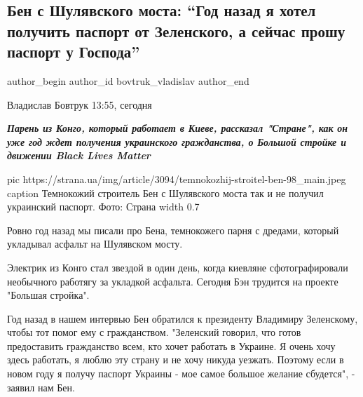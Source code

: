  
 
 
 
 
 
\subsection{Бен с Шулявского моста: \enquote{Год назад я хотел получить паспорт от Зеленского, а сейчас прошу паспорт у Господа}}
\label{sec:31_12_2020.news.ua.strana.bovtruk_vladislav.1.ben_s_shuljavskogo_mosta}
\ifcmt
	author_begin
   author_id bovtruk_vladislav
	author_end
\fi

Владислав Бовтрук 13:55, сегодня

\begin{leftbar}
  \begingroup
    \em\Large\bfseries\color{blue}
Парень из Конго, который работает в Киеве, рассказал "Стране", как он уже год
ждет получения украинского гражданства, о Большой стройке и движении Black
Lives Matter
  \endgroup
\end{leftbar}


\ifcmt
  pic https://strana.ua/img/article/3094/temnokozhij-stroitel-ben-98_main.jpeg
	caption Темнокожий строитель Бен с Шулявского моста так и не получил украинский паспорт. Фото: Страна 
  width 0.7
\fi


Ровно год назад мы писали про Бена, темнокожего парня с дредами, который
укладывал асфальт на Шулявском мосту.  

Электрик из Конго стал звездой в один день, когда киевляне
сфотографировали необычного работягу за укладкой асфальта. Сегодня Бэн
трудится на проекте "Большая стройка".

Год назад в нашем интервью Бен обратился к президенту Владимиру
Зеленскому, чтобы тот помог ему с гражданством. "Зеленский говорил, что
готов предоставить гражданство всем, кто хочет работать в Украине. Я очень
хочу здесь работать, я люблю эту страну и не хочу никуда уезжать. Поэтому
если в новом году я получу паспорт Украины - мое самое большое желание
сбудется", - заявил нам Бен.

